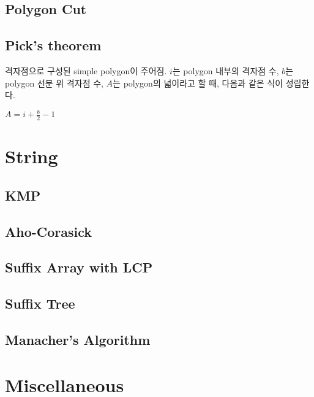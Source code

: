 \documentclass[10pt,landscape,a4paper,twocolumn]{article}
\begin{document}
\subsection{Polygon Cut}


\subsection{Pick's theorem}

격자점으로 구성된 simple polygon이 주어짐. $i$는 polygon 내부의 격자점 수, $b$는 polygon 선분 위 격자점 수, $A$는 polygon의 넓이라고 할 때, 다음과 같은 식이 성립한다.

$A = i + \frac{b}{2} - 1$

\section{String}

\subsection{KMP}


\subsection{Aho-Corasick}


\subsection{Suffix Array with LCP}


\subsection{Suffix Tree}

\subsection{Manacher's Algorithm}



\section{Miscellaneous}
\end{document}
